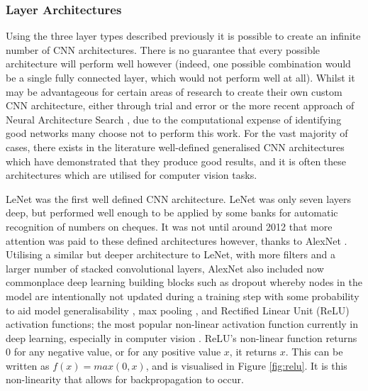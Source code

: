 \subsubsection{Layer Architectures}\label{ch:Background,sec:CNN,sub:CNN,subsub:layerArchitecture}

Using the three layer types described previously it is possible to create an infinite number of CNN architectures. There is no guarantee that every possible architecture will perform well however (indeed, one possible combination would be a single fully connected layer, which would not perform well at all). Whilst it may be advantageous for certain areas of research to create their own custom CNN architecture, either through trial and error or the more recent approach of Neural Architecture Search \cite{elsken_neural_2018}, due to the computational expense of identifying good networks many choose not to perform this work. For the vast majority of cases, there exists in the literature well-defined generalised CNN architectures which have demonstrated that they produce good results, and it is often these architectures which are utilised for computer vision tasks. 

LeNet \cite{lecun_gradient-based_1998} was the first well defined CNN architecture. LeNet was only seven layers deep, but performed well enough to be applied by some banks for automatic recognition of numbers on cheques. It was not until around 2012 that more attention was paid to these defined architectures however, thanks to AlexNet \cite{krizhevsky_imagenet_2012}. Utilising a similar but deeper architecture to LeNet, with more filters and a larger number of stacked convolutional layers, AlexNet also included now commonplace deep learning building blocks such as dropout whereby nodes in the model are intentionally not updated during a training step with some probability to aid model generalisability \cite{srivastava_dropout:_2014}, max pooling \cite{boureau_theoretical_2010}, and Rectified Linear Unit (ReLU) activation functions; the most popular non-linear activation function currently in deep learning, especially in computer vision \cite{he_delving_2015}. ReLU's non-linear function returns 0 for any negative value, or for any positive value $x$, it returns $x$. This can be written as $f(x) = max(0,x)$, and is visualised in Figure \ref{fig:relu}. It is this non-linearity that allows for backpropagation to occur.

